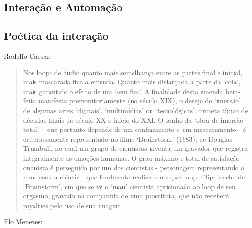 \documentclass{ppgmus}
\begin{document}
\subsection{Interação e Automação}


\subsection{Poética da interação}


Rodolfo Caesar:

\begin{quotation}
 Nos loops de áudio quanto mais semelhança entre as partes final e inicial, mais mascarada fica a
emenda. Quanto mais disfarçada a parte da ‘cola’, mais garantido o efeito de um ‘sem fim’. A finalidade
desta emenda bem-feita manifesta premonitoriamente (no século XIX), o desejo de ‘imersão’ de algumas
artes ‘digitais’, ‘multimídias’ ou ‘tecnológicas’, projeto típico de décadas finais do século XX e início do
XXI. O sonho da ‘obra de imersão total’ – que portanto depende de um confinamento e um mascaramento -
é criteriosamente representado no filme ‘Brainstorm’ (1983), de Douglas Trumbull, no qual um grupo de
cientistas inventa um gravador que registra integralmente as emoções humanas. O grau máximo e total de
satisfação onanista é perseguido por um dos cientistas - personagem representando o mau uso da ciência -
que finalmente realiza seu super-loop:
Clip: trecho de ‘Brainstorm’, em que se vê o ‘mau’ cientista aprisionado ao loop de seu orgasmo, gravado na
companhia de uma prostituta, que não receberá royalties pelo uso de sua imagem.
\end{quotation} 

Flo Menezes:
\end{document}
